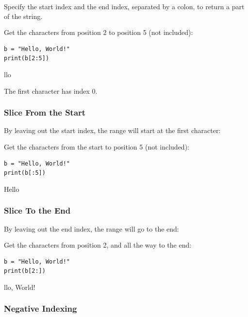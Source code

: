 \documentclass[12pt,a4paper]{article}
\begin{document}
Specify the start index and the end index, separated by a colon, to return a
part of the string.

\begin{ebox}
	Get the characters from position 2 to position 5 (not included):

	\begin{lstlisting}
b = "Hello, World!"
print(b[2:5])
	\end{lstlisting}
\tcblower
	\begin{vercode}
llo
	\end{vercode}
\end{ebox}

\begin{nbox}
	The first character has index 0.
\end{nbox}
\subsubsection{Slice From the Start}

By leaving out the start index, the range will start at the first character:

\begin{ebox}
	Get the characters from the start to position 5 (not included):
	\begin{lstlisting}
b = "Hello, World!"
print(b[:5])
	\end{lstlisting}
\tcblower
	\begin{vercode}
Hello
	\end{vercode}
\end{ebox}
\subsubsection{Slice To the End}

By leaving out the end index, the range will go to the end:

\begin{ebox}
Get the characters from position 2, and all the way to the end:
	\begin{lstlisting}
b = "Hello, World!"
print(b[2:])
	\end{lstlisting}
\tcblower
	\begin{vercode}
llo, World!
	\end{vercode}
\end{ebox}
\subsubsection{Negative Indexing}
\end{document}
